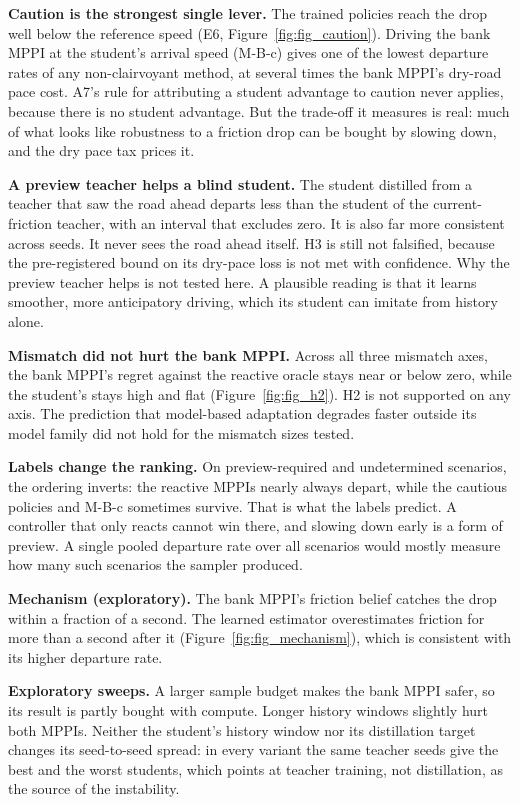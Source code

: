 \documentclass[11pt]{article}
\begin{document}
\textbf{Caution is the strongest single lever.} The trained policies reach the drop well below the reference speed
(E6, Figure~\ref{fig:fig_caution}). Driving the bank MPPI at the student's arrival speed (M-B-c) gives one of the lowest departure rates of any
non-clairvoyant method, at several times the bank MPPI's dry-road pace cost. A7's rule for attributing a student
advantage to caution never applies, because there is no student advantage. But the trade-off it measures is real:
much of what looks like robustness to a friction drop can be bought by slowing down, and the dry pace tax prices it.

\textbf{A preview teacher helps a blind student.} The student distilled from a teacher that saw the road ahead
departs less than the student of the current-friction teacher, with an interval that excludes zero. It is also far
more consistent across seeds. It never sees the road ahead itself. H3 is still not falsified, because the
pre-registered bound on its dry-pace loss is not met with confidence. Why the preview teacher helps is not tested
here. A plausible reading is that it learns smoother, more anticipatory driving, which its student can imitate from
history alone.

\textbf{Mismatch did not hurt the bank MPPI.} Across all three mismatch axes, the bank MPPI's regret against the
reactive oracle stays near or below zero, while the student's stays high and flat (Figure~\ref{fig:fig_h2}). H2 is not
supported on any axis. The prediction that model-based adaptation degrades faster outside its model family did not
hold for the mismatch sizes tested.

\textbf{Labels change the ranking.} On preview-required and undetermined scenarios, the ordering inverts: the
reactive MPPIs nearly always depart, while the cautious policies and M-B-c sometimes survive. That is what the
labels predict. A controller that only reacts cannot win there, and slowing down early is a form of preview. A
single pooled departure rate over all scenarios would mostly measure how many such scenarios the sampler produced.

\textbf{Mechanism (exploratory).} The bank MPPI's friction belief catches the drop within a fraction of a second.
The learned estimator overestimates friction for more than a second after it (Figure~\ref{fig:fig_mechanism}), which is
consistent with its higher departure rate.

\textbf{Exploratory sweeps.} A larger sample budget makes the bank MPPI safer, so its result is partly bought
with compute. Longer history windows slightly hurt both MPPIs. Neither the student's history window nor its
distillation target changes its seed-to-seed spread: in every variant the same teacher seeds give the best and the
worst students, which points at teacher training, not distillation, as the source of the instability.
\end{document}
